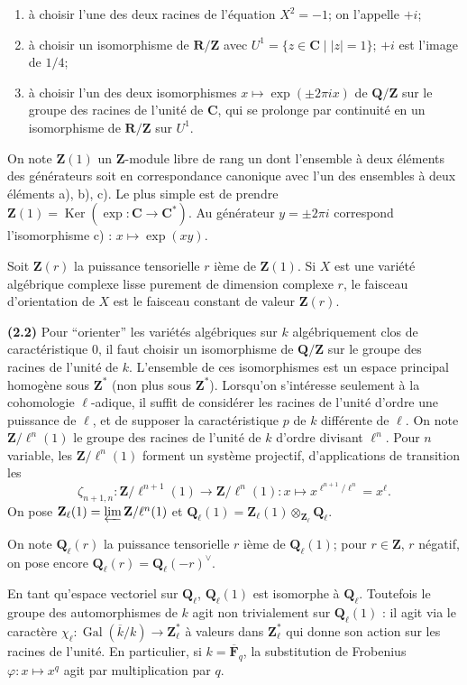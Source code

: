 \documentclass[12pt,a4paper]{amsart}
\theoremstyle{plain}
\theoremstyle{definition}
\theoremstyle{remark}
\DeclareMathOperator{\Ker}{Ker}
\DeclareMathOperator{\Gal}{Gal}
\newcommand{\Q}{\mathbf{Q}}
\newcommand{\Z}{\mathbf{Z}}
\newcommand{\F}{\mathbf{F}}
\newcommand{\C}{\mathbf{C}}
\newcommand{\R}{\mathbf{R}}
\numberwithin{equation}{section}
\begin{document}
\begin{enumerate}
\item[a)] \`a choisir l'une des deux racines de l'\'equation $X^2=-1$; on l'appelle $+i$;
\item[b)] \`a choisir un isomorphisme de $\R/\Z$ avec $U^1=\{z\in\C\mid |z|=1\}$; $+i$ est l'image de $1/4$;
\item[c)] \`a choisir l'un des deux isomorphismes $x\mapsto\exp(\pm 2\pi ix)$ de $\Q/\Z$ sur le groupe des racines de l'unit\'e de $\C$, qui se prolonge par continuit\'e en un isomorphisme de $\R/\Z$ sur $U^1$.
\end{enumerate}

On note $\Z(1)$ un $\Z$-module libre de rang un dont l'ensemble \`a deux \'el\'ements des g\'en\'erateurs soit en correspondance canonique avec l'un des ensembles \`a deux \'el\'ements a), b), c). Le plus simple est de prendre $\Z(1)=\Ker(\exp:\C\to\C^*)$. Au g\'en\'erateur $y=\pm 2\pi i$ correspond l'isomorphisme c) : $x\mapsto\exp(xy)$.

Soit $\Z(r)$ la puissance tensorielle $r$ i\`eme de $\Z(1)$. Si $X$ est une vari\'et\'e alg\'ebrique complexe lisse purement de dimension complexe $r$, le faisceau d'orientation de $X$ est le faisceau constant de valeur $\Z(r)$.

\noindent \textbf{(2.2)} Pour ``orienter'' les vari\'et\'es alg\'ebriques sur $k$ alg\'ebriquement clos de caract\'eristique $0$, il faut choisir un isomorphisme de $\Q/\Z$ sur le groupe des racines de l'unit\'e de $k$. L'ensemble de ces isomorphismes est un espace principal homog\`ene sous $\Z^*$ (non plus sous $\Z^*$). Lorsqu'on s'int\'eresse seulement \`a la cohomologie $\ell$-adique, il suffit de consid\'erer les racines de l'unit\'e d'ordre une puissance de $\ell$, et de supposer la caract\'eristique $p$ de $k$ diff\'erente de $\ell$. On note $\Z/\ell^n(1)$ le groupe des racines de l'unit\'e de $k$ d'ordre divisant $\ell^n$. Pour $n$ variable, les $\Z/\ell^n(1)$ forment un syst\`eme projectif, d'applications de transition les
\[
\zeta_{n+1,n} : \Z/\ell^{n+1}(1) \longrightarrow \Z/\ell^n(1) : x\mapsto x^{\ell^{n+1}/\ell^n} = x^\ell.
\]
On pose $\Z_\ell(1)=\varprojlim \Z/\ell^n(1)$ et $\Q_\ell(1)=\Z_\ell(1)\otimes_{\Z_\ell}\Q_\ell$.

On note $\Q_\ell(r)$ la puissance tensorielle $r$ i\`eme de $\Q_\ell(1)$; pour $r\in\Z$, $r$ n\'egatif, on pose encore $\Q_\ell(r)=\Q_\ell(-r)^\vee$.

En tant qu'espace vectoriel sur $\Q_\ell$, $\Q_\ell(1)$ est isomorphe \`a $\Q_\ell$. Toutefois le groupe des automorphismes de $k$ agit non trivialement sur $\Q_\ell(1)$ : il agit via le caract\`ere $\chi_\ell:\Gal(\overline{k}/k)\to\Z_\ell^*$ \`a valeurs dans $\Z_\ell^*$ qui donne son action sur les racines de l'unit\'e. En particulier, si $k=\overline{\F}_q$, la substitution de Frobenius $\varphi:x\mapsto x^q$ agit par multiplication par $q$.
\end{document}
